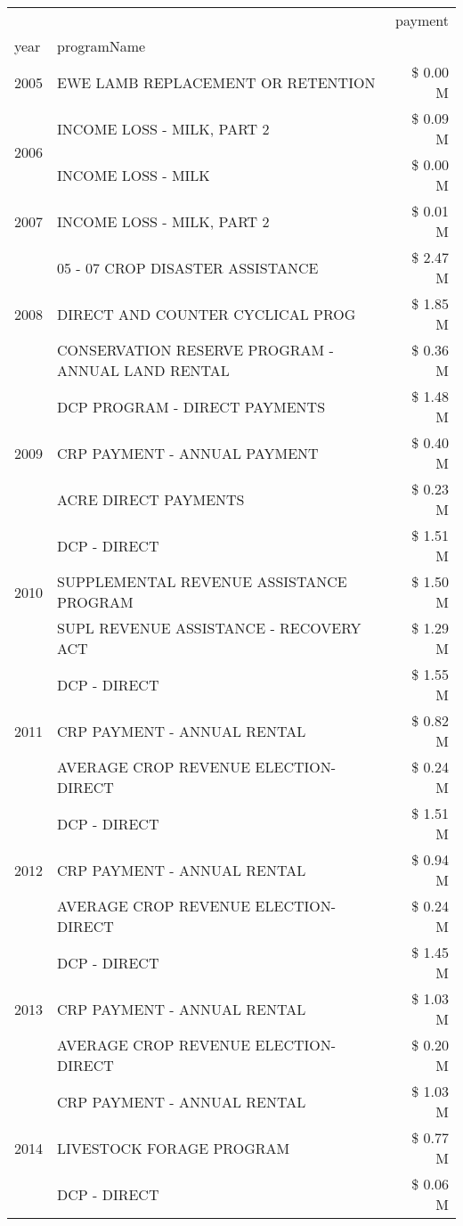 \begin{tabular}{llr}
\toprule
 &  & payment \\
year & programName &  \\
\midrule
2005 & EWE LAMB REPLACEMENT OR RETENTION & \$ 0.00 M \\
\cline{1-3}
\multirow[t]{2}{*}{2006} & INCOME LOSS - MILK, PART 2 & \$ 0.09 M \\
 & INCOME LOSS - MILK & \$ 0.00 M \\
\cline{1-3}
2007 & INCOME LOSS - MILK, PART 2 & \$ 0.01 M \\
\cline{1-3}
\multirow[t]{3}{*}{2008} & 05 - 07 CROP DISASTER ASSISTANCE & \$ 2.47 M \\
 & DIRECT AND COUNTER CYCLICAL PROG & \$ 1.85 M \\
 & CONSERVATION RESERVE PROGRAM - ANNUAL LAND RENTAL & \$ 0.36 M \\
\cline{1-3}
\multirow[t]{3}{*}{2009} & DCP PROGRAM - DIRECT PAYMENTS & \$ 1.48 M \\
 & CRP PAYMENT - ANNUAL PAYMENT & \$ 0.40 M \\
 & ACRE DIRECT PAYMENTS & \$ 0.23 M \\
\cline{1-3}
\multirow[t]{3}{*}{2010} & DCP - DIRECT & \$ 1.51 M \\
 & SUPPLEMENTAL REVENUE ASSISTANCE PROGRAM & \$ 1.50 M \\
 & SUPL REVENUE ASSISTANCE - RECOVERY ACT & \$ 1.29 M \\
\cline{1-3}
\multirow[t]{3}{*}{2011} & DCP - DIRECT & \$ 1.55 M \\
 & CRP PAYMENT - ANNUAL RENTAL & \$ 0.82 M \\
 & AVERAGE CROP REVENUE ELECTION-DIRECT & \$ 0.24 M \\
\cline{1-3}
\multirow[t]{3}{*}{2012} & DCP - DIRECT & \$ 1.51 M \\
 & CRP PAYMENT - ANNUAL RENTAL & \$ 0.94 M \\
 & AVERAGE CROP REVENUE ELECTION-DIRECT & \$ 0.24 M \\
\cline{1-3}
\multirow[t]{3}{*}{2013} & DCP - DIRECT & \$ 1.45 M \\
 & CRP PAYMENT - ANNUAL RENTAL & \$ 1.03 M \\
 & AVERAGE CROP REVENUE ELECTION-DIRECT & \$ 0.20 M \\
\cline{1-3}
\multirow[t]{3}{*}{2014} & CRP PAYMENT - ANNUAL RENTAL & \$ 1.03 M \\
 & LIVESTOCK FORAGE PROGRAM & \$ 0.77 M \\
 & DCP - DIRECT & \$ 0.06 M \\

\end{tabular}
